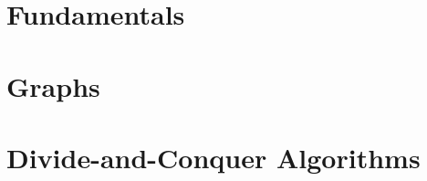 \documentclass{book}
\newcommand{\LoadSection}[1]{{}}
\begin{document}
\thispagestyle{plain}
\MakeCustomTitle
\bigskip


\begin{center}%
    \parbox{0.7\textwidth}{\doclicenseThis}%
\end{center}

{
    \hypersetup{linkcolor=black}
    \tableofcontents
}

\newpage
\mainmatter

\chapter{Fundamentals}%
\label{cha:fundamentals}

    \LoadSection{fundamentals/complexity-big-o}
    \LoadSection{fundamentals/binary-and-arithmetic/intro}
    \LoadSection{fundamentals/dynamic-arrays}
    \LoadSection{fundamentals/array-search-algorithms}
    \LoadSection{fundamentals/sorting-algorithms}
    \LoadSection{fundamentals/linked-lists}
    \LoadSection{fundamentals/bsts}
    \newpage
    \LoadSection{fundamentals/binary-heaps/intro}
    \LoadSection{fundamentals/binary-heaps/array-indexing}
    \newpage
    \LoadSection{fundamentals/binary-heaps/push}
    \newpage
    \LoadSection{fundamentals/binary-heaps/pop}
    \newpage
    \LoadSection{fundamentals/binary-heaps/pushpop}
    \newpage
    \LoadSection{fundamentals/binary-heaps/heapify}
    \newpage
    \LoadSection{fundamentals/binary-heaps/further-reading}
    \LoadSection{fundamentals/binary-heaps/references}
    \newpage
    \LoadSection{fundamentals/tries}
    \LoadSection{fundamentals/hash-tables}

\newpage
\chapter{Graphs}%
\label{cha:graphs}

    \LoadSection{graphs/basic-definitions}
    \newpage
    \LoadSection{graphs/graph-representation}
    \newpage
    \LoadSection{graphs/more-theoretical-results}
    \LoadSection{graphs/more-definitions}
    \LoadSection{graphs/references}

\newpage
\chapter{Divide-and-Conquer Algorithms}%
\label{cha:doc}

    \LoadSection{divide-and-conquer/intro}
    \LoadSection{divide-and-conquer/karatsuba-multiplication}
    \LoadSection{divide-and-conquer/fft}
\end{document}
